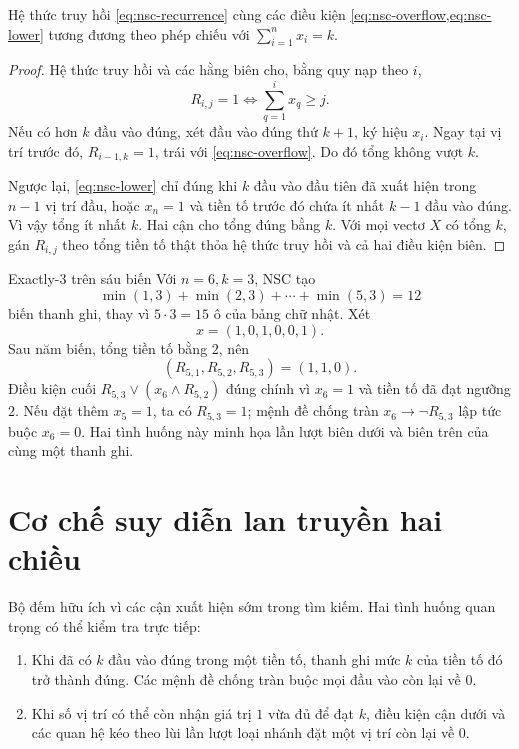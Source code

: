 \begin{theorem}
Hệ thức truy hồi \cref{eq:nsc-recurrence} cùng các điều kiện
\cref{eq:nsc-overflow,eq:nsc-lower} tương đương theo phép chiếu với
\(\sum_{i=1}^{n}x_i=k\).
\end{theorem}

\begin{proof}
Hệ thức truy hồi và các hằng biên cho, bằng quy nạp theo \(i\),
\[
  R_{i,j}=1
  \Longleftrightarrow
  \sum_{q=1}^{i}x_q\ge j.
\]
Nếu có hơn \(k\) đầu vào đúng, xét đầu vào đúng thứ \(k+1\), ký hiệu \(x_i\).
Ngay tại vị trí trước đó, \(R_{i-1,k}=1\), trái với
\cref{eq:nsc-overflow}. Do đó tổng không vượt \(k\).

Ngược lại, \cref{eq:nsc-lower} chỉ đúng khi \(k\) đầu vào đầu tiên đã xuất hiện
trong \(n-1\) vị trí đầu, hoặc \(x_n=1\) và tiền tố trước đó chứa ít nhất
\(k-1\) đầu vào đúng. Vì vậy tổng ít nhất \(k\). Hai cận cho tổng đúng bằng
\(k\). Với mọi vectơ \(X\) có tổng \(k\), gán \(R_{i,j}\) theo tổng tiền tố
thật thỏa hệ thức truy hồi và cả hai điều kiện biên.
\end{proof}

\begin{workedexample}{Exactly-\(3\) trên sáu biến}
Với \(n=6,k=3\), NSC tạo
\[
  \min(1,3)+\min(2,3)+\cdots+\min(5,3)=12
\]
biến thanh ghi, thay vì \(5\cdot3=15\) ô của bảng chữ nhật. Xét
\[
  x=(1,0,1,0,0,1).
\]
Sau năm biến, tổng tiền tố bằng \(2\), nên
\[
  (R_{5,1},R_{5,2},R_{5,3})=(1,1,0).
\]
Điều kiện cuối
\(
R_{5,3}\lor(x_6\land R_{5,2})
\)
đúng chính vì \(x_6=1\) và tiền tố đã đạt ngưỡng \(2\). Nếu đặt thêm
\(x_5=1\), ta có \(R_{5,3}=1\); mệnh đề chống tràn
\(x_6\rightarrow\neg R_{5,3}\) lập tức buộc \(x_6=0\). Hai tình huống này
minh họa lần lượt biên dưới và biên trên của cùng một thanh ghi.
\end{workedexample}

\section{Cơ chế suy diễn lan truyền hai chiều}

Bộ đếm hữu ích vì các cận xuất hiện sớm trong tìm kiếm. Hai tình huống quan
trọng có thể kiểm tra trực tiếp:

\begin{enumerate}
  \item Khi đã có \(k\) đầu vào đúng trong một tiền tố, thanh ghi mức \(k\) của
  tiền tố đó trở thành đúng. Các mệnh đề chống tràn buộc mọi đầu vào còn lại về \(0\).
  \item Khi số vị trí có thể còn nhận giá trị \(1\) vừa đủ để đạt \(k\), điều
  kiện cận dưới và các quan hệ kéo theo lùi lần lượt loại nhánh đặt một vị trí còn
  lại về \(0\).
\end{enumerate}

